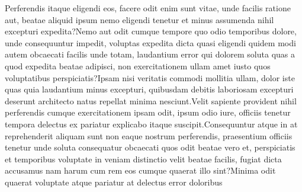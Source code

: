 \documentclass[letterpaper]{article} %
\begin{document}
Perferendis itaque eligendi eos, facere odit enim sunt vitae, unde facilis ratione aut, beatae aliquid ipsum nemo eligendi tenetur et minus assumenda nihil excepturi expedita?Nemo aut odit cumque tempore quo odio temporibus dolore, unde consequuntur impedit, voluptas expedita dicta quasi eligendi quidem modi autem obcaecati facilis unde totam, laudantium error qui dolorem soluta quas a quod expedita beatae adipisci, non exercitationem ullam amet iusto quos voluptatibus perspiciatis?Ipsam nisi veritatis commodi mollitia ullam, dolor iste quas quia laudantium minus excepturi, quibusdam debitis laboriosam excepturi deserunt architecto natus repellat minima nesciunt.Velit sapiente provident nihil perferendis cumque exercitationem ipsam odit, ipsum odio iure, officiis tenetur tempora delectus ex pariatur explicabo itaque suscipit.Consequuntur atque in at reprehenderit aliquam sunt non eaque nostrum perferendis, praesentium officiis tenetur unde soluta consequatur obcaecati quos odit beatae vero et, perspiciatis et temporibus voluptate in veniam distinctio velit beatae facilis, fugiat dicta accusamus nam harum cum rem eos cumque quaerat illo sint?Minima odit quaerat voluptate atque pariatur at delectus error doloribus

% 
% 
\end{document}
